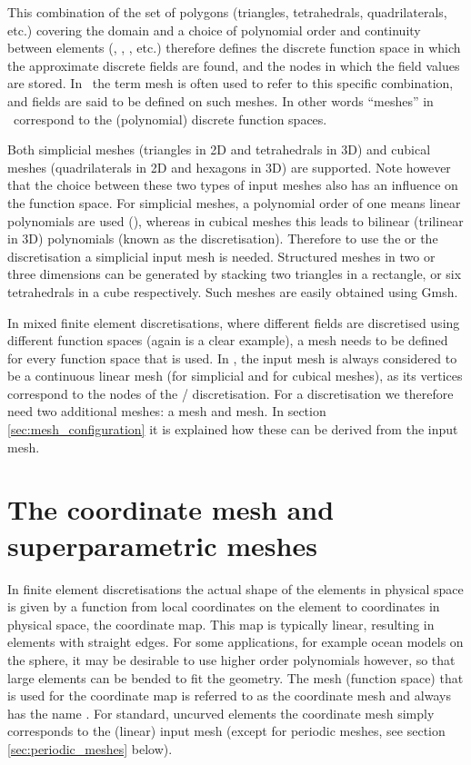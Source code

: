 This combination of the set of polygons (triangles, tetrahedrals,
quadrilaterals, etc.) covering the domain
and a choice of polynomial order and continuity between
elements (\Pone, \PoDG, \Ptwo, etc.) therefore defines the discrete function
space in which the approximate discrete fields are found, and the nodes
in which the field values are stored. In \fluidity\
the term mesh is often used to refer to this specific combination, and fields are said
to be defined on such meshes. In other words ``meshes'' in \fluidity\ correspond
to the (polynomial) discrete function spaces.

Both simplicial meshes (triangles in 2D and tetrahedrals in 3D) and cubical
meshes (quadrilaterals in 2D and hexagons in 3D) are supported. Note however
that the choice between these two types of input meshes also has an influence
on the function space. For simplicial meshes, a polynomial order
of one means linear polynomials are used (\Pone), whereas in cubical meshes this
leads to bilinear (trilinear in 3D) polynomials (known as the \Qone
discretisation). Therefore to use
the \Poo or the \PoDGPt discretisation
a simplicial input mesh is needed. Structured meshes in two
or three dimensions can be generated by stacking two triangles in a rectangle,
or six tetrahedrals in a cube respectively. Such meshes are easily obtained
using Gmsh.

In mixed finite element discretisations, where different fields are discretised
using different function spaces (again \PoDGPt is a clear example), a mesh needs
to be defined for every function space that is used. In \fluidity,
the input mesh is always considered to be a
continuous linear mesh (\Pone for simplicial and \Qone for
cubical meshes), as its vertices correspond to the nodes of the \Pone/\Qone
discretisation. For a \PoDGPt discretisation we therefore need two additional
meshes: a \PoDG mesh and \Ptwo mesh. In section \ref{sec:mesh_configuration} it
is explained how these can be derived from the input mesh.

\section{The coordinate mesh and superparametric meshes}
\label{sec:coordinate_mesh_and_superparametric}
In finite element discretisations the actual shape of the elements in physical
space is given by a function from local coordinates on the element to
coordinates in physical space, the coordinate map. This map is typically linear,
resulting in elements with straight edges. For some applications, for example
ocean models on the sphere, it may be desirable to use higher order
polynomials however, so that large elements can be bended to fit the
geometry. The mesh (function space) that is used for the coordinate map is
referred to as the coordinate mesh and always has the name
. For standard, uncurved elements
the coordinate mesh simply corresponds to the (linear) input mesh
(except for periodic meshes, see section \ref{sec:periodic_meshes} below).


